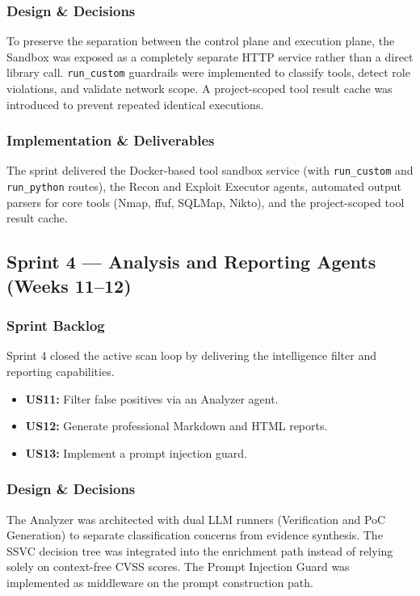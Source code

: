 \documentclass[12pt,a4paper]{report}
\begin{document}
\subsubsection{Design \& Decisions}
To preserve the separation between the control plane and execution plane, the Sandbox was exposed as a completely separate HTTP service rather than a direct library call. \texttt{run\_custom} guardrails were implemented to classify tools, detect role violations, and validate network scope. A project-scoped tool result cache was introduced to prevent repeated identical executions.

\subsubsection{Implementation \& Deliverables}
The sprint delivered the Docker-based tool sandbox service (with \texttt{run\_custom} and \texttt{run\_python} routes), the Recon and Exploit Executor agents, automated output parsers for core tools (Nmap, ffuf, SQLMap, Nikto), and the project-scoped tool result cache.

\subsection{Sprint 4 --- Analysis and Reporting Agents (Weeks 11--12)}

\subsubsection{Sprint Backlog}
Sprint 4 closed the active scan loop by delivering the intelligence filter and reporting capabilities.
\begin{itemize}
    \item \textbf{US11:} Filter false positives via an Analyzer agent.
    \item \textbf{US12:} Generate professional Markdown and HTML reports.
    \item \textbf{US13:} Implement a prompt injection guard.
\end{itemize}

\subsubsection{Design \& Decisions}
The Analyzer was architected with dual LLM runners (Verification and PoC Generation) to separate classification concerns from evidence synthesis. The SSVC decision tree was integrated into the enrichment path instead of relying solely on context-free CVSS scores. The Prompt Injection Guard was implemented as middleware on the prompt construction path.
\end{document}
